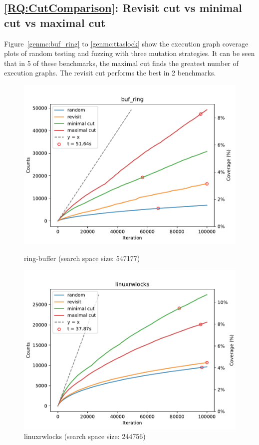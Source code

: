 \subsection{\ref*{RQ:CutComparison}: Revisit cut vs minimal cut vs maximal cut }

Figure~\ref{genmc:buf_ring} to \ref{genmc:ttaslock} show the execution graph coverage plots of random testing and fuzzing with three mutation strategies. It can be seen that in 5 of these benchmarks, the maximal cut finds the greatest number of execution graphs. The revisit cut performs the best in 2 benchmarks.

\begin{figure}[h!]

	\centering
	\begin{minipage}{0.45\textwidth}
		\centering
		\includegraphics[width=\textwidth]{figure/genmc/buf_ring.pdf}
		\caption{ring-buffer (search space size: 547177)}
		\label{genmc:buf_ring}
	\end{minipage}
	\hfill
	\begin{minipage}{0.45\textwidth}
		\centering
		\includegraphics[width=\textwidth]{figure/genmc/linuxrwlocks.pdf}
		\caption{linuxrwlocks (search space size: 244756)}
		\label{genmc:linuxrwlocks}
	\end{minipage}


\end{figure}
